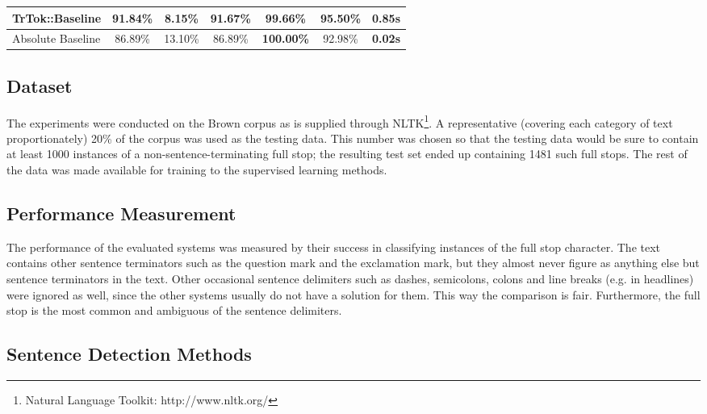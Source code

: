 \begin{table*}
\begin{center}
\begin{tabular}{ | l | c | c | c | c | c | r | }
      TrTok::Baseline & 91.84\% & 8.15\% & 91.67\%
                      & 99.66\% & 95.50\% & 0.85s \\ \hline
      Absolute Baseline & 86.89\% & 13.10\% & 86.89\%
                        & \textbf{100.00\%} & 92.98\% & \textbf{0.02s} \\ \hline
    \end{tabular}
  \end{center}
  \caption[Performance of sentence detectors on the Brown corpus] {The
    performance of the various sentence detectors on full stops from
    the Brown corpus testing data. \\ The 1.15 MB of testing data
    consisted of 11376 sentences and 232893 tokens.}
  \label{tbl:grand-melee}
\end{table*}

\subsection{Dataset}

The experiments were conducted on the Brown corpus \cite{data-brown}
as is supplied through NLTK\footnote{Natural Language Toolkit:
http://www.nltk.org/}. A representative (covering each category of
text proportionately) 20\% of the corpus was used as the testing data.
This number was chosen so that the testing data would be sure to
contain at least 1000 instances of a non-sentence-terminating full
stop; the resulting test set ended up containing 1481 such full stops.
The rest of the data was made available for training to the supervised
learning methods.

\subsection{Performance Measurement}

The performance of the evaluated systems was measured by their success
in classifying instances of the full stop character. The text contains
other sentence terminators such as the question mark and the
exclamation mark, but they almost never figure as anything else but
sentence terminators in the text. Other occasional sentence delimiters
such as dashes, semicolons, colons and line breaks (e.g. in headlines)
were ignored as well, since the other systems usually do not have a
solution for them. This way the comparison is fair. Furthermore, the
full stop is the most common and ambiguous of the sentence delimiters.

\subsection{Sentence Detection Methods}

